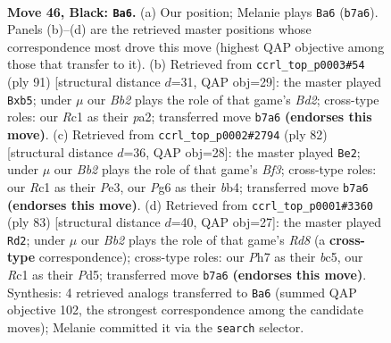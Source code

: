 \documentclass[11pt]{article}
\begin{document}
\clearpage

\begin{figure}[p]\centering
\begin{subfigure}{0.46\textwidth}\centering
\resizebox{\linewidth}{!}{%
\newchessgame
\chessboard[
  setfen={6k1/1b3p1p/6p1/4Pp2/5P2/1B5N/P4KPP/1nr5 b - - 1 46},
  showmover=false,
  pgfstyle=straightmove, color=movearrow, markmove={b7-a6}
]}
\caption{}
\end{subfigure}\hfill
\begin{subfigure}{0.46\textwidth}\centering
\resizebox{\linewidth}{!}{%
\newchessgame
\chessboard[
  setfen={8/3b1kn1/3p2p1/pPpP1p2/8/1P3NPB/P6P/6K1 b - - 0 46},
  showmover=false,
  pgfstyle=straightmove, color=movearrow, markmove={d7-b5}
]}
\caption{}
\end{subfigure}
\\[4pt]
\begin{subfigure}{0.46\textwidth}\centering
\resizebox{\linewidth}{!}{%
\newchessgame
\chessboard[
  setfen={8/1p1k3p/2p2p2/p1n2N2/Pb3PP1/1P2PB2/2K5/8 w - - 13 42},
  showmover=false,
  pgfstyle=straightmove, color=movearrow, markmove={f3-e2}
]}
\caption{}
\end{subfigure}\hfill
\begin{subfigure}{0.46\textwidth}\centering
\resizebox{\linewidth}{!}{%
\newchessgame
\chessboard[
  setfen={6k1/5pp1/4p1p1/2BpN3/3P3P/5KP1/5P2/3r4 b - - 5 42},
  showmover=false,
  pgfstyle=straightmove, color=movearrow, markmove={d1-d2}
]}
\caption{}
\end{subfigure}
\caption{\textbf{Move 46, Black: \texttt{Ba6}.} (a) Our position; Melanie plays \texttt{Ba6} (\texttt{b7a6}). Panels (b)--(d) are the retrieved master positions whose correspondence most drove this move (highest QAP objective among those that transfer to it). (b) Retrieved from \texttt{ccrl\_top\_p0003\#54} (ply 91) [structural distance $d$=31, QAP obj=29]: the master played \texttt{Bxb5}; under $\mu$ our \emph{Bb2} plays the role of that game's \emph{Bd2}; cross-type roles: our \emph{R}c1 as their \emph{p}a2; transferred move \texttt{b7a6} \textbf{(endorses this move)}. (c) Retrieved from \texttt{ccrl\_top\_p0002\#2794} (ply 82) [structural distance $d$=36, QAP obj=28]: the master played \texttt{Be2}; under $\mu$ our \emph{Bb2} plays the role of that game's \emph{Bf3}; cross-type roles: our \emph{R}c1 as their \emph{P}e3, our \emph{P}g6 as their \emph{b}b4; transferred move \texttt{b7a6} \textbf{(endorses this move)}. (d) Retrieved from \texttt{ccrl\_top\_p0001\#3360} (ply 83) [structural distance $d$=40, QAP obj=27]: the master played \texttt{Rd2}; under $\mu$ our \emph{Bb2} plays the role of that game's \emph{Rd8} (a \textbf{cross-type} correspondence); cross-type roles: our \emph{P}h7 as their \emph{b}c5, our \emph{R}c1 as their \emph{P}d5; transferred move \texttt{b7a6} \textbf{(endorses this move)}. Synthesis: 4 retrieved analogs transferred to \texttt{Ba6} (summed QAP objective 102, the strongest correspondence among the candidate moves); Melanie committed it via the \texttt{search} selector.}
\label{fig:thought-m91}
\end{figure}
\end{document}
